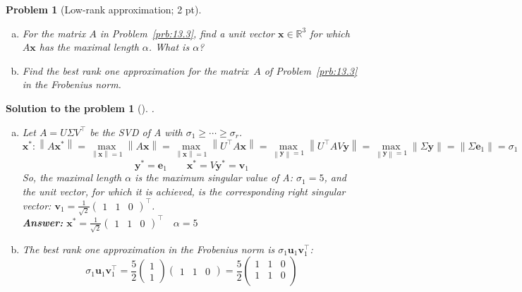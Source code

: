 \documentclass[12pt,a4]{article}
\newtheorem{problem}{Problem}
\newtheorem{solution}{Solution to the problem}
\newcommand{\bR}{{\mathbb R}}
\newcommand{\bu}{{\mathbf u}}
\newcommand{\bv}{{\mathbf v}}
\newcommand{\bx}{{\mathbf x}}
\newcommand{\by}{{\mathbf y}}
\newcommand{\be}{{\mathbf e}}
\newcommand{\norm}[1]{\left\lVert#1\right\rVert}
\newcommand{\answer}[1]{\textbf{Answer:} #1}
\begin{document}
\begin{problem}[Low-rank approximation; 2 pt]\label{prb:13.5}\rm
\begin{enumerate}[(a)]
	\item For the matrix $A$ in Problem~\ref{prb:13.3}, find a unit vector $\bx \in \bR^3$ for which $A\bx$ has the maximal length $\alpha$. What is $\alpha$?
	\item Find the best rank one approximation for the matrix~$A$ of Problem~\ref{prb:13.3} in the Frobenius norm.	
\end{enumerate}
\end{problem}

\begin{solution}[] \rm .
\begin{enumerate}[(a)]
	\item Let $A = U\Sigma V^\top$ be the SVD of A with $\sigma_1 \geq \cdots \geq \sigma_r$.
\[
\bx^*: \norm{A\bx^*} = \max_{\norm{\bx} = 1} \norm{A\bx} = \max_{\norm{\bx} = 1} \norm{U^\top A \bx} = \max_{\norm{\by} = 1} \norm{U^\top A V \by} = \max_{\norm{\by} = 1} \norm{\Sigma\by} = \norm{\Sigma\be_1} = \sigma_1
\]
\[
\by^* = \be_1 \qquad \bx^* = V \by^* = \bv_1
\]
So, the maximal length $\alpha$ is the maximum singular value of A: $\sigma_1=5$, and the unit vector, for which it is achieved, is the corresponding right singular vector: $\bv_1=\frac1{\sqrt2}\begin{pmatrix} 1 & 1 & 0 \end{pmatrix}^\top$.\\
\answer{$
\bx^* = \frac1{\sqrt2}\begin{pmatrix} 1 & 1 & 0 \end{pmatrix}^\top
\quad
\alpha=5
$}
	\item The best rank one approximation in the Frobenius norm is $\sigma_1\bu_1\bv_1^\top$:
\[
\sigma_1\bu_1\bv_1^\top = \frac52
\begin{pmatrix} 1 \\ 1 \end{pmatrix}
\begin{pmatrix} 1 & 1 & 0 \end{pmatrix}
= \frac52
\begin{pmatrix}
1 & 1 & 0 \\
1 & 1 & 0 \\
\end{pmatrix}
\]\\
\end{enumerate}
\end{solution}
\end{document}
